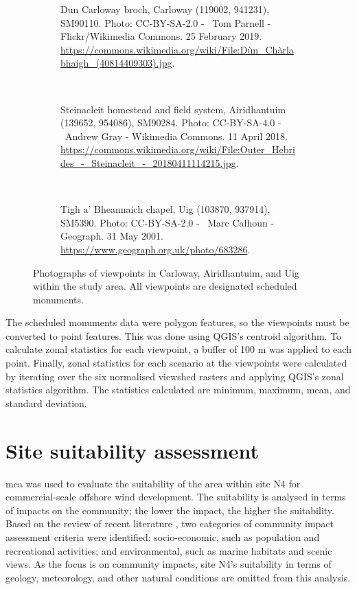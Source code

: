 \begin{figure}
\centering
\begin{subfigure}[t]{.48\textwidth}
\caption*{Dun Carloway broch, Carloway (119002, 941231), SM90110. Photo:
CC-BY-SA-2.0 - \textcopyright~Tom Parnell - Flickr/Wikimedia Commons. 25
February 2019.
\url{https://commons.wikimedia.org/wiki/File:Dùn_Chàrlabhaigh_(40814409303).jpg}.}
\end{subfigure}
~
\begin{subfigure}[t]{.48\textwidth}
\caption*{Steinacleit homestead and field system, Airidhantuim (139652,
954086), SM90284. Photo: CC-BY-SA-4.0 - \textcopyright~Andrew Gray - Wikimedia
Commons. 11 April 2018.
\url{https://commons.wikimedia.org/wiki/File:Outer_Hebrides_-_Steinacleit_-_20180411114215.jpg}.}
\end{subfigure}
\\[.5cm]
\begin{subfigure}[t]{.48\textwidth}
\caption*{Tigh a' Bheannaich chapel, Uig (103870, 937914), SM5390. Photo:
CC-BY-SA-2.0 - \textcopyright~Marc Calhoun - Geograph. 31 May 2001.
\url{https://www.geograph.org.uk/photo/683286}.}
\end{subfigure}
\caption{Photographs of viewpoints in Carloway, Airidhantuim, and Uig within
the study area. All viewpoints are designated scheduled monuments.
\label{fig:viewpoints2}}
\end{figure}

The scheduled monuments data were polygon features, so the viewpoints must be
converted to point features. This was done using QGIS's centroid algorithm. To
calculate zonal statistics for each viewpoint, a buffer of 100 m was applied to
each point. Finally, zonal statistics for each scenario at the viewpoints were
calculated by iterating over the six normalised viewshed rasters and applying
QGIS's zonal statistics algorithm. The statistics calculated are minimum,
maximum, mean, and standard deviation.

\clearpage
\section{Site suitability assessment}

\gls{mca} was used to evaluate the suitability of the area within site N4 for
commercial-scale offshore wind development. The suitability is analysed in
terms of impacts on the community; the lower the impact, the higher the
suitability. Based on the review of recent literature
\autocite{gaveriaux2019,mekonnen2015,vasileiou2017,tercan2020,deveci2020,mahdy2018,basset2021},
two categories of community impact assessment criteria were
identified: socio-economic, such as population and recreational activities; and
environmental, such as marine habitats and scenic views. As the focus is on
community impacts, site N4's suitability in terms of geology, meteorology, and
other natural conditions are omitted from this analysis.

